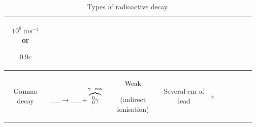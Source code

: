 \documentclass[oneside]{book}
\begin{document}
\begin{itemize}
\begin{table}[H]
\begin{tabular}{ScScScScSc}
\begin{minipage}{3cm-23pt}
                \(10^8\text{ ms}^{-1}\) or 
                
                \(0.9c\)
            \end{minipage}\\
            \midrule
            Gamma decay & 
            \begin{minipage}{3cm}
                \vspace{-4.07mm}
                \[\rule{0.5cm}{0.05mm}\to \rule{0.5cm}{0.05mm}+\overbrace{\ce{_0^0\gamma}}^{
                    \mathclap{\gamma-\text{ray}}}\]
            \end{minipage}& 
            \begin{minipage}{2cm}
                \centering
                Weak

                (indirect ionisation)
            \end{minipage}&
            \begin{minipage}{2cm}
                \centering
                Several cm of lead
            \end{minipage}& \(c\)\\
            \bottomrule
        \end{tabular}
        \caption{Types of radioactive decay.}
        \label{table:types-of-radioactive-decay}
    \end{table}


\end{itemize}
\end{document}
